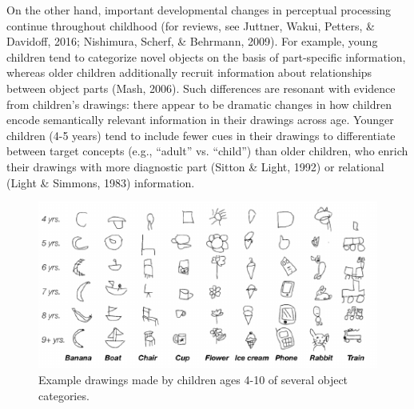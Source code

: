 \documentclass[10pt, letterpaper]{article}
\newenvironment{CodeChunk}{}{}
\begin{document}
On the other hand, important developmental changes in perceptual
processing continue throughout childhood (for reviews, see Juttner,
Wakui, Petters, \& Davidoff, 2016; Nishimura, Scherf, \& Behrmann,
2009). For example, young children tend to categorize novel objects on
the basis of part-specific information, whereas older children
additionally recruit information about relationships between object
parts (Mash, 2006). Such differences are resonant with evidence from
children's drawings: there appear to be dramatic changes in how children
encode semantically relevant information in their drawings across age.
Younger children (4-5 years) tend to include fewer cues in their
drawings to differentiate between target concepts (e.g., ``adult'' vs.
``child'') than older children, who enrich their drawings with more
diagnostic part (Sitton \& Light, 1992) or relational (Light \& Simmons,
1983) information.

\begin{CodeChunk}
\begin{figure}[h]

{\centering \includegraphics[width=1\linewidth]{figs/exampleDrawings-1} 

}

\caption[Example drawings made by children ages 4-10 of several object categories]{Example drawings made by children ages 4-10 of several object categories.}\label{fig:exampleDrawings}
\end{figure}
\end{CodeChunk}
\end{document}

